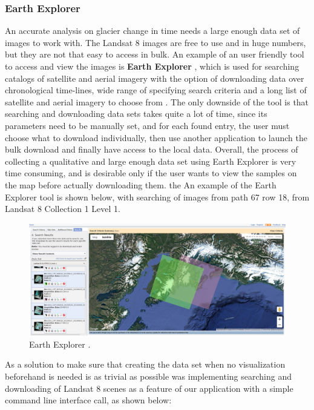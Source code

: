 \documentclass[12pt, a4paper]{report}
\begin{document}
	\subsubsection{Earth Explorer}
	An accurate analysis on glacier change in time needs a large enough data set of images to work with. The Landsat 8 images are free to use and in huge numbers, but they are not that easy to access in bulk. An example of an user friendly tool to access and view the images is \textbf{Earth Explorer} \cite{earth_explorer_1}, which is used for searching catalogs of satellite and aerial imagery with the option of downloading data over chronological time-lines, wide range of specifying search criteria and a long list of satellite and aerial imagery to choose from \cite{earth_explorer_2}. The only downside of the tool is that searching and downloading data sets takes quite a lot of time, since its parameters need to be manually set, and for each found entry, the user must choose what to download individually, then use another application to launch the bulk download and finally have access to the local data. Overall, the process of collecting a qualitative and large enough data set using Earth Explorer is very time consuming, and is desirable only if the user wants to view the samples on the map before actually downloading them. the An example of the Earth Explorer tool is shown below, with searching of images from path 67 row 18, from Landsat 8 Collection 1 Level 1.
	\begin{figure}[H]
		\centering
		\includegraphics[scale=0.85]{earth_explorerpng.png}
		\caption{Earth Explorer \cite{earth_explorer_1}.}
		\label{fig:Earth_Explorer}
	\end{figure}
	\vfill 
	As a solution to make sure that creating the data set when no visualization beforehand is needed is as trivial as possible was implementing searching and downloading of Landsat 8 scenes as a feature of our application with a simple command line interface call, as shown below:
\end{document}
